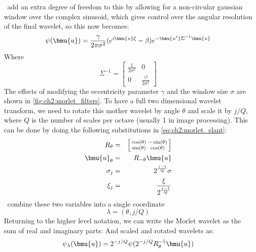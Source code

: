   \Mallat\ add an extra degree of freedom to this by allowing for a non-circular
  gaussian window over the complex sinusoid, which gives control over the angular
  resolution of the final wavelet, so this now becomes:
  \begin{equation}
    \psi(\bmu{u}) = \frac{\gamma}{2\pi\sigma^2}{(e^{i\bmu{u}\xi} - \beta)}
                  e^{-\bmu{u^t}\Sigma^{-1}  \bmu{u}} 
    \label{eq:ch2:morlet_slant}
  \end{equation}
  Where
  $$\Sigma^{-1} = \left[ \begin{smallmatrix} 
      \frac{1}{2\sigma^2} & 0 \\ 
      0 & \frac{\gamma^2}{2\sigma^2} 
      \end{smallmatrix} \right] $$
  The effects of modifying the eccentricity parameter $\gamma$ and the window size
  $\sigma$ are shown in \autoref{fig:ch2:morlet_filters}. To have a full two
  dimensional wavelet transform, we need to rotate this mother wavelet by angle
  $\theta$ and scale it by $j/Q$, where $Q$ is the number of scales per octave
  (usually 1 in image processing). 
  This can be done by doing the following
  substitutions in \eqref{eq:ch2:morlet_slant}:
  \begin{eqnarray*}
    R_{\theta}& = &\left[ \begin{smallmatrix}
                    \cos(\theta) & -\sin(\theta) \\
                    \sin(\theta) & \cos(\theta)
                  \end{smallmatrix} \right] \\
    \bmu{u}_{\theta} & = & R_{-\theta} \bmu{u} \\
    \sigma_j & = & 2^{\frac{j-1}{Q}} \sigma \\
    \xi_j & = & \frac{\xi}{2^{\frac{j-1}{Q}}}
  \end{eqnarray*}
  \Mallat\ combine these two variables into a single coordinate
  \begin{equation}
    \lambda = (\theta, j/Q)
  \end{equation}
  Returning to the higher level notation, we can write
  the Morlet wavelet as the sum of real and imaginary parts: And scaled and
  rotated wavelets as:
  \begin{equation}
    \psi_{\lambda}(\bmu{u}) = 2^{-j/Q}\psi(2^{-j/Q}R_{\theta}^{-1} \bmu{u})
  \end{equation}
